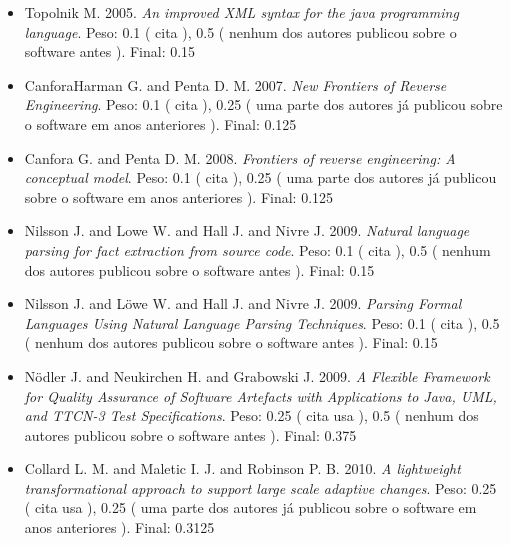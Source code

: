 \begin{itemize}
\item Topolnik M.
      2005.
        \textit{ An improved XML syntax for the java programming language}.
      Peso:
      0.1 (
          cita
      ),
      0.5 (
nenhum dos autores publicou sobre o software antes
      ).
      Final:
      0.15

\item CanforaHarman G. and Penta D. M.
      2007.
        \textit{ New Frontiers of Reverse Engineering}.
      Peso:
      0.1 (
          cita
      ),
      0.25 (
uma parte dos autores já publicou sobre o software em anos anteriores
      ).
      Final:
      0.125

\item Canfora G. and Penta D. M.
      2008.
        \textit{ Frontiers of reverse engineering: A conceptual model}.
      Peso:
      0.1 (
          cita
      ),
      0.25 (
uma parte dos autores já publicou sobre o software em anos anteriores
      ).
      Final:
      0.125

\item Nilsson J. and Lowe W. and Hall J. and Nivre J.
      2009.
        \textit{ Natural language parsing for fact extraction from source code}.
      Peso:
      0.1 (
          cita
      ),
      0.5 (
nenhum dos autores publicou sobre o software antes
      ).
      Final:
      0.15

\item Nilsson J. and L\"{o}we W. and Hall J. and Nivre J.
      2009.
        \textit{ Parsing Formal Languages Using Natural Language Parsing Techniques}.
      Peso:
      0.1 (
          cita
      ),
      0.5 (
nenhum dos autores publicou sobre o software antes
      ).
      Final:
      0.15

\item Nödler J. and Neukirchen H. and Grabowski J.
      2009.
        \textit{ A Flexible Framework for Quality Assurance of Software Artefacts with Applications to Java, UML, and TTCN-3 Test Specifications}.
      Peso:
      0.25 (
          cita
          usa
      ),
      0.5 (
nenhum dos autores publicou sobre o software antes
      ).
      Final:
      0.375

\item Collard L. M. and Maletic I. J. and Robinson P. B.
      2010.
        \textit{ A lightweight transformational approach to support large scale adaptive changes}.
      Peso:
      0.25 (
          cita
          usa
      ),
      0.25 (
uma parte dos autores já publicou sobre o software em anos anteriores
      ).
      Final:
      0.3125


\end{itemize}
